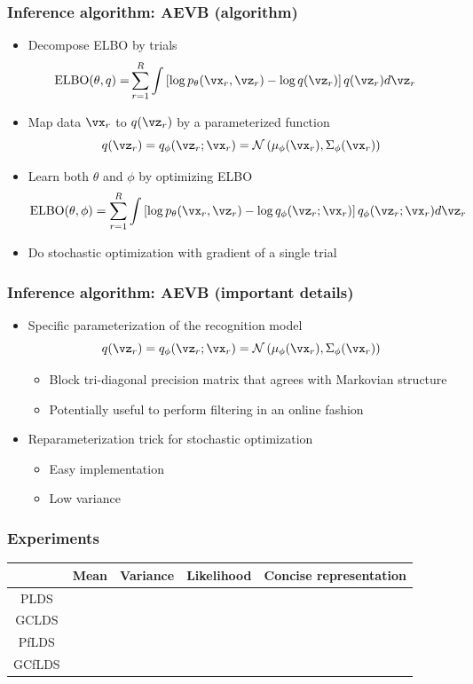 \documentclass[16pt,presentation]{beamer}
\newcommand{\cmark}{\ding{51}}%
\newcommand{\xmark}{\ding{55}}%
\begin{document}
\begin{frame}
\frametitle{Inference algorithm: AEVB (algorithm)}
\begin{itemize}
\item Decompose ELBO by trials
\[\begin{split}
\text{ELBO}(\theta, q) %
=& \sum_{r=1}^{R} \int \left[\log p_{\theta}(\vx_r, \vz_r) - \log q(\vz_r)\right] q(\vz_r) d\vz_r 
\end{split}\]
\item Map data $\vx_r$ to $q(\vz_r)$ by a parameterized function
\[q(\vz_r) = q_\phi(\vz_r; \vx_r) = \N\left(\mu_\phi(\vx_r), \Sigma_\phi(\vx_r)\right)\]
\item Learn both $\theta$ and $\phi$ by optimizing ELBO
\[\text{ELBO}(\theta, \phi) = \sum_{r=1}^{R} \int \left[\log p_{\theta}(\vx_r, \vz_r) - \log q_\phi(\vz_r; \vx_r)\right] q_\phi(\vz_r; \vx_r) d\vz_r \]
\item Do stochastic optimization with gradient of a single trial
\end{itemize}
\end{frame}


\begin{frame}
\frametitle{Inference algorithm: AEVB (important details)}
\begin{itemize}
\item Specific parameterization of the recognition model
\[q(\vz_r) = q_\phi(\vz_r; \vx_r) = \N\left(\mu_\phi(\vx_r), \Sigma_\phi(\vx_r)\right)\]
\vspace{-0.5cm}
\begin{itemize}
\item Block tri-diagonal precision matrix that agrees with Markovian structure
\item Potentially useful to perform filtering in an online fashion
\end{itemize}
\item Reparameterization trick for stochastic optimization
\begin{itemize}
\item Easy implementation
\item Low variance
\end{itemize}
\end{itemize}
\end{frame}

\begin{frame}
\frametitle{Experiments}
\begin{center}
\begin{tabular}{ ccccc } 
 \hline
  & Mean & Variance & Likelihood & \alert{Concise representation}\\
 \hline
 PLDS & \cmark & \xmark& \xmark &  \xmark  \\ 
 GCLDS &\cmark &\cmark &\cmark &  \xmark  \\ 
 \alert{PfLDS} & \cmark & \xmark& \xmark &   \cmark\\ 
 \alert{GCfLDS} &\cmark &\cmark &\cmark &  \cmark \\ 
 \hline
\end{tabular}
\end{center}
\end{frame}
\end{document}
